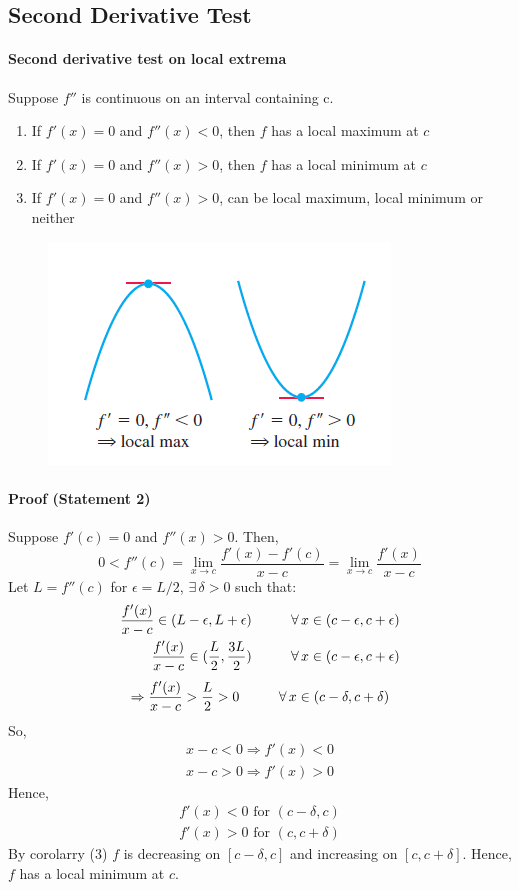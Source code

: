 \documentclass[12pt]{article}
\newcommand\tab[1][1cm]{\hspace*{#1}}
\begin{document}
\subsection{Second Derivative Test}
\paragraph{Second derivative test on local extrema}
Suppose $f''$ is continuous on an interval containing c. 
\begin{enumerate} 
     \item If $f'(x) = 0$ and $f''(x) < 0$, then $f$ has a local maximum at $c$
     \item If $f'(x) = 0$ and $f''(x) > 0$, then $f$ has a local minimum at $c$
     \item If $f'(x) = 0$ and $f''(x) > 0$, can be local maximum, local minimum or neither
\end{enumerate}

\begin{figure}[h!]
    \centering
    \includegraphics[width = 0.3\linewidth]{Images/second derivative test.png}
\end{figure}

\paragraph{Proof (Statement 2)}
Suppose $f'(c) = 0$ and $f''(x) > 0$. Then, 
\[
    0 < f''(c) = \lim_{x \to c} \frac{f'(x) - f'(c)}{x - c} = \lim_{x \to c} \frac{f'(x)}{x - c} 
\]
\noindent
Let $L = f''(c)$ for $\epsilon = L/2$, $\exists \, \delta > 0$ such that:
\begin{align*} 
     \frac{f'(x)}{x - c} \in (L - \epsilon, L + \epsilon) \textrm{\tab} \forall \, x \in (c - \epsilon, c + \epsilon) \\
     \frac{f'(x)}{x - c} \in (\frac{L}{2}, \frac{3L}{2}) \textrm{\tab} \forall \, x \in (c - \epsilon, c + \epsilon) 
\end{align*}
\[
    \Rightarrow \frac{f'(x)}{x - c} > \frac{L}{2} > 0 \textrm{\tab} \forall \, x \in (c - \delta, c + \delta) 
\]
So, 
\begin{align*} 
    x - c < 0 \Rightarrow f'(x) < 0 \\
    x - c > 0 \Rightarrow f'(x) > 0
\end{align*}
\noindent
Hence, 
\begin{align*} 
    f'(x) < 0 \textrm{ for } (c - \delta, c) \\
    f'(x) > 0 \textrm{ for } (c, c + \delta)
\end{align*}
By corolarry (3) $f$ is decreasing on $[c - \delta, c]$ and increasing on $[c, c + \delta]$. Hence, $f$ 
has a local minimum at $c$.
\end{document}
